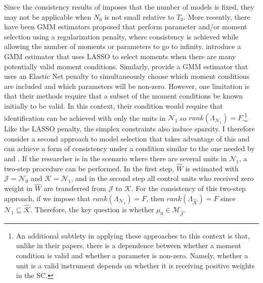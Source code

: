 \documentclass{article}
\begin{document}
Since the consistency results of \cite{MomentSelection} imposes that the number of models is fixed, they may not be applicable when $N_0$ is not small relative to $T_0$. More recently, there have been GMM estimators proposed that perform parameter and/or moment selection using a regularization penalty, where consistency is achieved while allowing the number of moments or parameters to go to infinity. \cite{ChengLiao2015} introduce a GMM estimator that uses LASSO to select moments when there are many potentially valid moment conditions. Similarly, \cite{ElasticNetGMM} provide a GMM estimator that uses an Elastic Net penalty to simultaneously choose which moment conditions are included and which parameters will be non-zero. However, one limitation is that their methods require that a subset of the moment conditions be known initially to be valid. In this context, their condition would require that identification can be achieved with only the units in $\mathcal{N}_1$ so $rank(\Lambda_{\mathcal{N}_1}) = F$.\footnote{An additional subtlety in applying these approaches to this context is that, unlike in their papers, there is a dependence between whether a moment condition is valid and whether a parameter is non-zero. Namely, whether a unit is a valid instrument depends on whether it is receiving positive weights in the SC.} Like the LASSO penalty, the simplex constraints also induce sparsity. I therefore consider a second approach to model selection that takes advantage of this and can achieve a form of consistency under a condition similar to the one needed by \cite{ChengLiao2015} and \cite{ElasticNetGMM}. If the researcher is in the scenario where there are several units in $\mathcal{N}_1$, a two-step procedure can be performed. In the first step, $\hat{W}$ is estimated with $\mathcal{J} = \mathcal{N}_0$ and $\mathcal{K} = \mathcal{N}_1$, and in the second step all control units who received zero weight in $\hat{W}$ are transferred from $\mathcal{J}$ to $\mathcal{K}$. For the consistency of this two-step approach, if we impose that $rank(\Lambda_{\mathcal{N}_1}) = F$, then $rank(\Lambda_{\hat{\mathcal{K}}}) =F$ since
$\mathcal{N}_1 \subseteq \hat{\mathcal{K}}$. Therefore, the key question is whether $\mu_0 \in \mathcal{M}_{\hat{\mathcal{J}}}$.
\end{document}
